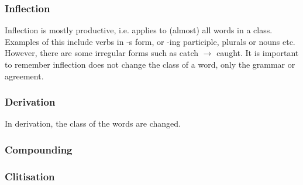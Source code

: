 \documentclass[Report.tex]{subfiles}
\begin{document}
\subsubsection{Inflection}
Inflection is mostly productive, i.e. applies to (almost) all words in a class.
Examples of this include verbs in -s form, or -ing participle, plurals
or nouns etc. However, there are some irregular forms such as
catch $\rightarrow$ caught. It is important to remember inflection does
not change the class of a word, only the grammar or agreement.
\subsubsection{Derivation}
In derivation, the class of the words are changed.
\begin{itemize}

\end{itemize}

\subsubsection{Compounding}
\subsubsection{Clitisation}
\end{document}
